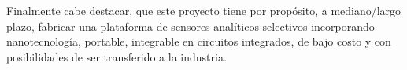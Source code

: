 	Finalmente cabe destacar, que este proyecto tiene por propósito, a mediano/largo plazo, fabricar una plataforma de sensores analíticos selectivos incorporando nanotecnología, portable, integrable en circuitos integrados, de bajo costo y con posibilidades de ser transferido a la industria.